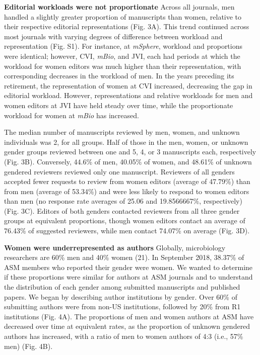 \documentclass[11pt,]{article}
\begin{document}
\textbf{Editorial workloads were not proportionate} Across all journals,
men handled a slightly greater proportion of manuscripts than women,
relative to their respective editorial representations (Fig. 3A). This
trend continued across most journals with varying degrees of difference
between workload and representation (Fig. S1). For instance, at
\emph{mSphere}, workload and proportions were identical; however, CVI,
\emph{mBio}, and JVI, each had periods at which the workload for women
editors was much higher than their representation, with corresponding
decreases in the workload of men. In the years preceding its retirement,
the representation of women at CVI increased, decreasing the gap in
editorial workload. However, representations and relative workloads for
men and women editors at JVI have held steady over time, while the
proportionate workload for women at \emph{mBio} has increased.

The median number of manuscripts reviewed by men, women, and unknown
individuals was 2, for all groups. Half of those in the men, women, or
unknown gender groups reviewed between one and 5, 4, or 3 manuscripts
each, respectively (Fig. 3B). Conversely, 44.6\% of men, 40.05\% of
women, and 48.61\% of unknown gendered reviewers reviewed only one
manuscript. Reviewers of all genders accepted fewer requests to review
from women editors (average of 47.79\%) than from men (average of
53.34\%) and were less likely to respond to women editors than men (no
response rate averages of 25.06 and 19.8566667\%, respectively) (Fig.
3C). Editors of both genders contacted reviewers from all three gender
groups at equivalent proportions, though women editors contact an
average of 76.43\% of suggested reviewers, while men contact 74.07\% on
average (Fig. 3D).

\textbf{Women were underrepresented as authors} Globally, microbiology
researchers are 60\% men and 40\% women (21). In September 2018, 38.37\%
of ASM members who reported their gender were women. We wanted to
determine if these proportions were similar for authors at ASM journals
and to understand the distribution of each gender among submitted
manuscripts and published papers. We began by describing author
institutions by gender. Over 60\% of submitting authors were from non-US
institutions, followed by 20\% from R1 institutions (Fig. 4A). The
proportions of men and women authors at ASM have decreased over time at
equivalent rates, as the proportion of unknown gendered authors has
increased, with a ratio of men to women authors of 4:3 (i.e., 57\% men)
(Fig. 4B).
\end{document}
